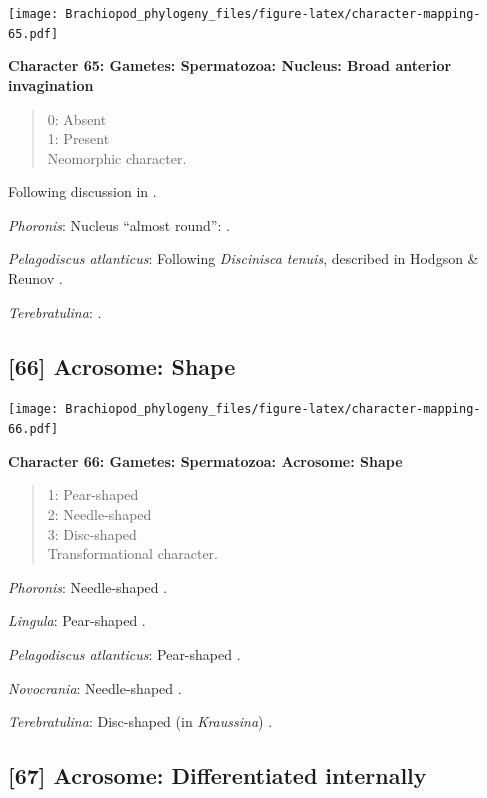 \documentclass[]{book}
\theoremstyle{definition}
\theoremstyle{definition}
\theoremstyle{definition}
\theoremstyle{remark}
\begin{document}
\texttt{[image: Brachiopod\_phylogeny\_files/figure-latex/character-mapping-65.pdf]}

\textbf{Character 65: Gametes: Spermatozoa: Nucleus: Broad anterior
invagination}

\begin{quote}
0: Absent\\
1: Present\\
Neomorphic character.
\end{quote}

Following discussion in \citet{Hodgson1994Ultrastructureof}.

\emph{Phoronis}: Nucleus ``almost round'':
\citet{Reunov2004Ultrastructuralstudy}.

\emph{Pelagodiscus atlanticus}: Following \emph{Discinisca}
\emph{tenuis}, described in Hodgson \& Reunov
\citeyearpar{Hodgson1994Ultrastructureof}.

\emph{Terebratulina}: \citet{Hodgson1994Ultrastructureof}.

\hypertarget{acrosome-shape}{%
\subsection*{{[}66{]} Acrosome: Shape}\label{acrosome-shape}}

\texttt{[image: Brachiopod\_phylogeny\_files/figure-latex/character-mapping-66.pdf]}

\textbf{Character 66: Gametes: Spermatozoa: Acrosome: Shape}

\begin{quote}
1: Pear-shaped\\
2: Needle-shaped\\
3: Disc-shaped\\
Transformational character.
\end{quote}

\emph{Phoronis}: Needle-shaped \citep{Reunov2004Ultrastructuralstudy}.

\emph{Lingula}: Pear-shaped \citep{Fukumoto2003Theacrosome}.

\emph{Pelagodiscus atlanticus}: Pear-shaped
\citep{Hodgson1994Ultrastructureof}.

\emph{Novocrania}: Needle-shaped \citep{Afzelius1978Finestructure}.

\emph{Terebratulina}: Disc-shaped (in \emph{Kraussina})
\citep{Hodgson1994Ultrastructureof}.

\hypertarget{acrosome-differentiated-internally}{%
\subsection*{{[}67{]} Acrosome: Differentiated
internally}\label{acrosome-differentiated-internally}}
\end{document}
